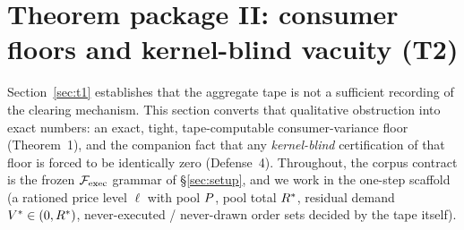 \section{Theorem package II: consumer floors and kernel-blind vacuity (T2)}
\label{sec:t2}

Section~\ref{sec:t1} establishes that the aggregate tape is not a sufficient
recording of the clearing mechanism. This section converts that qualitative
obstruction into exact numbers: an exact, tight, tape-computable
consumer-variance floor (Theorem~1), and the companion fact that any
\emph{kernel-blind} certification of that floor is forced to be identically
zero (Defense~4). Throughout, the corpus contract is the frozen
$\mathcal{F}_{\mathrm{exec}}$ grammar of \S\ref{sec:setup}, and we work in the one-step scaffold
(a rationed price level $\ell$ with pool $P$, pool total $R^{*}$,
residual demand $V^{*} \in (0,R^{*})$, never-executed / never-drawn order
sets decided by the tape itself).

